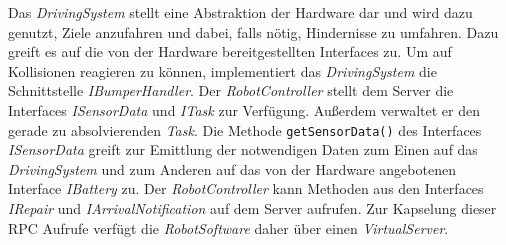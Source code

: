 Das \textit{DrivingSystem} stellt eine Abstraktion der Hardware dar und wird dazu genutzt, Ziele anzufahren und dabei,
falls nötig, Hindernisse zu umfahren. Dazu greift es auf die von der Hardware bereitgestellten Interfaces zu.
Um auf Kollisionen reagieren zu können, implementiert das \textit{DrivingSystem} die Schnittstelle \textit{IBumperHandler}.
Der \textit{RobotController} stellt dem Server die Interfaces \textit{ISensorData} und \emph{ITask} zur Verfügung. Außerdem verwaltet er den gerade zu absolvierenden \emph{Task}. 
Die Methode \texttt{getSensorData()} des Interfaces \textit{ISensorData} greift zur Emittlung der notwendigen Daten zum Einen auf das \textit{DrivingSystem} und zum Anderen auf das von der Hardware angebotenen Interface \textit{IBattery} zu.
Der \emph{RobotController} kann Methoden aus den Interfaces \emph{IRepair} und \emph{IArrivalNotification} auf dem Server aufrufen. Zur Kapselung dieser RPC Aufrufe verfügt die \emph{RobotSoftware} daher über einen \emph{VirtualServer}.
